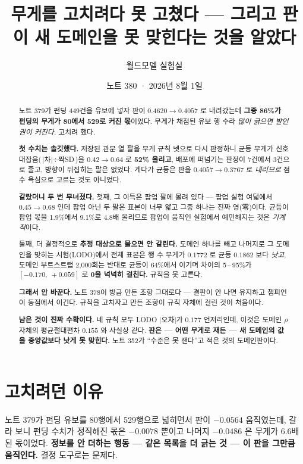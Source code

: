 \documentclass[11pt]{article}
\begin{document}
\title{무게를 고치려다 못 고쳤다 --- 그리고 판이 새 도메인을 못 맞힌다는 것을 알았다}
\author{월드모델 실험실}
\date{노트 380 · 2026년 8월 1일}
\maketitle

\begin{abstract}
노트 379가 펀딩 449건을 유보에 넣자 판이 $0.4620 \to 0.4057$ 로 내려갔는데
\textbf{그중 86\%가 펀딩의 무게가 80에서 529로 커진 몫}이었다. 무게가
채점된 유보 행 수라 \emph{많이 긁으면 발언권이 커진다.} 고치려 했다.

\textbf{첫 수치는 솔깃했다.} 저장된 관문 열 팔을 무게 규칙 넷으로 다시
판정하니 균등 무게가 신호대잡음(\,$|$차$|\div$짝SD\,)을 $0.42 \to 0.64$ 로
\textbf{52\% 올리고}, 배포에 떠넘기는 판정이 7건에서 3건으로 줄고,
방향이 뒤집히는 팔은 없었다. 게다가 균등은 판을 $0.4057 \to 0.3767$ 로
\emph{내리므로} 점수 욕심으로 고르는 것도 아니었다.

\textbf{갈랐더니 두 번 무너졌다.} 첫째, 그 이득은 팝업 팔에 몰려 있다 ---
팝업 실험 여덟에서 $0.45\to0.68$ 인데 팝업 아닌 두 팔은 표본이 너무 얇고
그중 하나는 진짜 영(零)이다. 균등이 팝업 몫을 1.9\%에서 9.1\%로 4.8배
올리므로 팝업이 움직인 실험에서 예민해지는 것은 \emph{기계적}이다.

둘째, 더 결정적으로 \textbf{추정 대상으로 물으면 안 갈린다.} 도메인 하나를
빼고 나머지로 그 도메인을 맞히는 시험(LODO)에서 전체 표본은 행 수 무게가
$0.1772$ 로 균등 $0.1862$ 보다 \emph{낫고}, 도메인 부트스트랩 2,000회는
반대로 균등이 64\%에서 이기며 차이의 5\,--\,95\%가
$[-0.170,\ +0.059]$ 로 \textbf{0을 넉넉히 걸친다.} 규칙을 못 고른다.

\textbf{그래서 안 바꾼다.} 노트 378이 방금 만든 조항 그대로다 --- 결판이
안 나면 유지하고 챔피언이 동점에서 이긴다. 규칙을 고치자고 만든 조항이
규칙 자체에 걸린 것이 처음이다.

\textbf{남은 것이 진짜 수확이다.} 네 규칙 모두 LODO $|$오차$|$가 $0.177$
언저리인데, 이것은 도메인 $\rho$ 자체의 평균절대편차 $0.155$ 와 사실상
같다. \textbf{판은 --- 어떤 무게로 재든 --- 새 도메인의 값을 중앙값보다
낫게 못 맞힌다.} 노트 352가 ``수준은 못 잰다''고 적은 것의 도메인판이다.
\end{abstract}

\section{고치려던 이유}

노트 379가 펀딩 유보를 80행에서 529행으로 넓히면서 판이 $-0.0564$
움직였는데, 갈라 보니 펀딩 수치가 정직해진 몫은 $-0.0078$ 뿐이고 나머지
$-0.0486$ 은 무게가 6.6배 된 몫이었다. \textbf{정보를 안 더하는 행동
--- 같은 목록을 더 긁는 것 --- 이 판을 그만큼 움직인다.} 결정 도구로는
문제다.
\end{document}
